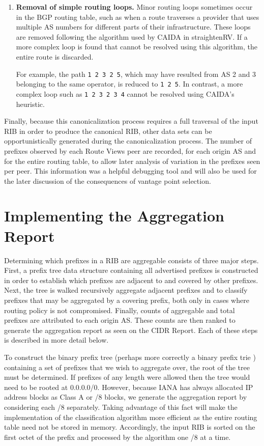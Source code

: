 \begin{enumerate}
{For example, the path \verb!1 1 1 2 3 3 4! would be collapsed to \verb!1 2 3 4!.}

\item{\textbf{Removal of simple routing loops.} Minor routing loops sometimes occur in the BGP routing table, such as when a route traverses a provider that uses multiple AS numbers for different parts of their infrastructure. These loops are removed following the algorithm used by CAIDA in straightenRV\cite{straightenrv}. If a more complex loop is found that cannot be resolved using this algorithm, the entire route is discarded.

For example, the path \verb!1 2 3 2 5!, which may have resulted from AS 2 and 3 belonging to the same operator, is reduced to \verb!1 2 5!. In contrast, a more complex loop such as \verb!1 2 3 2 3 4! cannot be resolved using CAIDA's heuristic.}
\end{enumerate}

Finally, because this canonicalization process requires a full traversal of the input RIB in order to produce the canonical RIB, other data sets can be opportunistically generated during the canonicalization process. The number of prefixes observed by each Route Views peer are recorded, for each origin AS and for the entire routing table, to allow later analysis of variation in the prefixes seen per peer. This information was a helpful debugging tool and will also be used for the later discussion of the consequences of vantage point selection.

\section{Implementing the Aggregation Report}

Determining which prefixes in a RIB are aggregable consists of three major steps. First, a prefix tree data structure containing all advertised prefixes is constructed in order to establish which prefixes are adjacent to and covered by other prefixes. Next, the tree is walked recursively aggregate adjacent prefixes and to classify prefixes that may be aggregated by a covering prefix, both only in cases where routing policy is not compromised. Finally, counts of aggregable and total prefixes are attributed to each origin AS. These counts are then ranked to generate the aggregation report as seen on the CIDR Report. Each of these steps is described in more detail below.

To construct the binary prefix tree (perhaps more correctly a binary prefix trie \cite{Wu:2008fk}) containing a set of prefixes that we wish to aggregate over, the root of the tree must be determined. If prefixes of any length were allowed then the tree would need to be rooted at 0.0.0.0/0. However, because IANA has always allocated IP address blocks as Class A or /8 blocks, we generate the aggregation report by considering each /8 separately. Taking advantage of this fact will make the implementation of the classification algorithm more efficient as the entire routing table need not be stored in memory. Accordingly, the input RIB is sorted on the first octet of the prefix and processed by the algorithm one /8 at a time.


